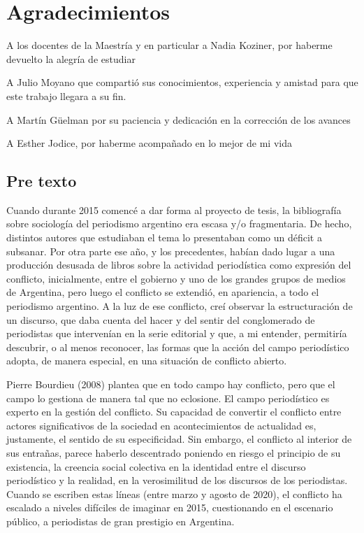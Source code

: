 \chapter{Agradecimientos}

A los docentes de la Maestría y en particular a Nadia Koziner, por haberme devuelto la alegría de estudiar

A Julio Moyano que compartió sus conocimientos, experiencia y amistad para que este trabajo llegara a su fin.

A Martín Güelman por su paciencia y dedicación en la corrección de los avances

A Esther Jodice, por haberme acompañado en lo mejor de mi vida

\section{Pre texto}

Cuando durante 2015 comencé a dar forma al proyecto de tesis, la bibliografía sobre sociología del periodismo argentino era escasa y/o fragmentaria. De hecho, distintos autores que estudiaban el tema lo presentaban como un déficit a subsanar. Por otra parte ese año, y los precedentes, habían dado lugar a una producción desusada de libros sobre la actividad periodística como expresión del conflicto, inicialmente, entre el gobierno y uno de los grandes grupos de medios de Argentina, pero luego el conflicto se extendió, en apariencia, a todo el periodismo argentino. A la luz de ese conflicto, creí observar la estructuración de un discurso, que daba cuenta del hacer y del sentir del conglomerado de periodistas que intervenían en la serie editorial y que, a mi entender, permitiría descubrir, o al menos reconocer, las formas que la acción del campo periodístico adopta, de manera especial, en una situación de conflicto abierto.

Pierre Bourdieu (2008) plantea que en todo campo hay conflicto, pero que el campo lo gestiona de manera tal que no eclosione. El campo periodístico es experto en la gestión del conflicto. Su capacidad de convertir el conflicto entre actores significativos de la sociedad en acontecimientos de actualidad es, justamente, el sentido de su especificidad. Sin embargo, el conflicto al interior de sus entrañas, parece haberlo descentrado poniendo en riesgo el principio de su existencia, la creencia social colectiva en la identidad entre el discurso periodístico y la realidad, en la verosimilitud de los discursos de los periodistas. Cuando se escriben estas líneas (entre marzo y agosto de 2020), el conflicto ha escalado a niveles difíciles de imaginar en 2015, cuestionando en el escenario público, a periodistas de gran prestigio en Argentina.

